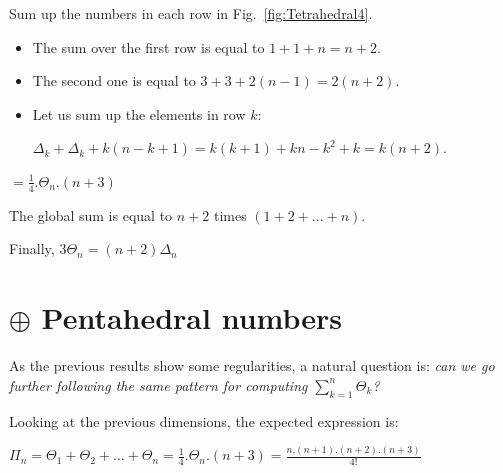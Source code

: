 Sum up the numbers in each row in Fig.~\ref{fig:Tetrahedral4}.
\begin{itemize}
\item 
The sum over the first row is equal to $1+1+n = n+2$.
\item
The second one is equal to $3 + 3 + 2(n-1) = 2(n+2)$. 
\item
Let us sum up the elements in row $k$: 

$\Delta_k + \Delta_k + k(n-k+1)  = k(k+1) + kn-k^2+k = k(n+2)$.
\end{itemize}
$= \frac{1}{4}.\Theta_n.(n+3)$

The global sum is equal to $n+2$ times $(1+2+...+n)$.

Finally, $3 \Theta_n = (n+2) \Delta_n$
\medskip

\noindent {}


\section{$\oplus$ Pentahedral numbers}

As the previous results show some regularities, a natural question is: \textit{can we go further following the same pattern for computing 
$ \sum_{k=1}^{n} \Theta_k$?}
\medskip

Looking at the previous dimensions, the expected expression is:

$\Pi_n = \Theta_1 + \Theta_2 + ... + \Theta_n = \frac{1}{4}.\Theta_n.(n+3) = \frac{n.(n+1).(n+2).(n+3)}{4!} $

